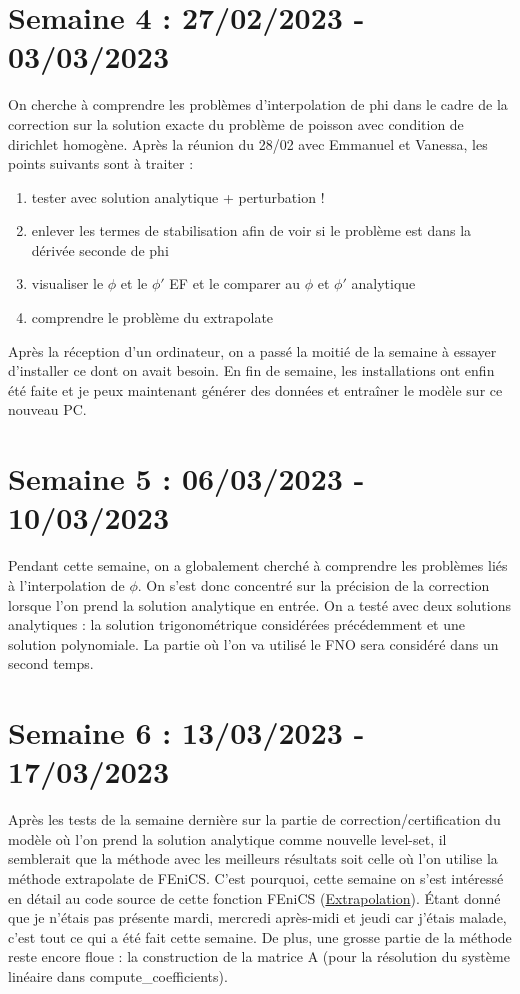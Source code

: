 \documentclass[french]{article}
\begin{document}
\section{Semaine 4 : 27/02/2023 - 03/03/2023}
	On cherche à comprendre les problèmes d'interpolation de phi dans le cadre de la correction sur la solution exacte du problème de poisson avec condition de dirichlet homogène. Après la réunion du 28/02 avec Emmanuel et Vanessa, les points suivants sont à traiter :
	\begin{enumerate}[label=\textbullet]
		\item tester avec solution analytique + perturbation !
		\item enlever les termes de stabilisation afin de voir si le problème est dans la dérivée seconde de phi
		\item visualiser le $\phi$ et le $\phi'$ EF et le comparer au $\phi$ et $\phi'$ analytique
		\item comprendre le problème du extrapolate
	\end{enumerate}
	Après la réception d'un ordinateur, on a passé la moitié de la semaine à essayer d'installer ce dont on avait besoin. En fin de semaine, les installations ont enfin été faite et je peux maintenant générer des données et entraîner le modèle sur ce nouveau PC.
\section{Semaine 5 : 06/03/2023 - 10/03/2023}
	Pendant cette semaine, on a globalement cherché à comprendre les problèmes liés à l'interpolation de $\phi$. On s'est donc concentré sur la précision de la correction lorsque l'on prend la solution analytique en entrée. On a testé avec deux solutions analytiques : la solution trigonométrique considérées précédemment et une solution polynomiale. La partie où l'on va utilisé le FNO sera considéré dans un second temps.
\section{Semaine 6 : 13/03/2023 - 17/03/2023}
	Après les tests de la semaine dernière sur la partie de correction/certification du modèle où l'on prend la solution analytique comme nouvelle level-set, il semblerait que la méthode avec les meilleurs résultats soit celle où l'on utilise la méthode extrapolate de FEniCS. C'est pourquoi, cette semaine on s'est intéressé en détail au code source de cette fonction FEniCS (\href{https://fenics.readthedocs.io/projects/dolfin/en/2017.2.0/apis/api_adaptivity.html#extrapolation}{Extrapolation}). Étant donné que je n'étais pas présente mardi, mercredi après-midi et jeudi car j'étais malade, c'est tout ce qui a été fait cette semaine. De plus, une grosse partie de la méthode reste encore floue : la construction de la matrice A (pour la résolution du système linéaire dans compute\_coefficients).
\end{document}
